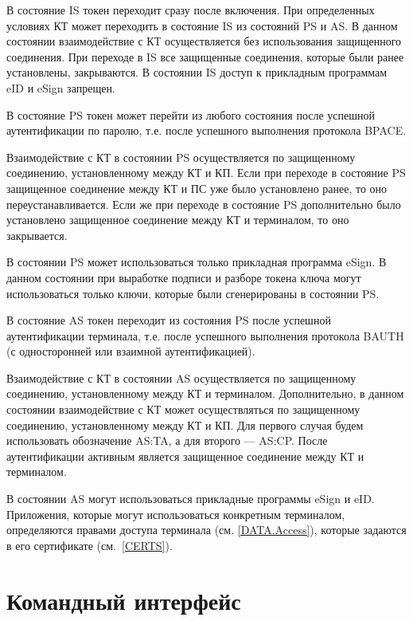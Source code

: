 В состояние IS токен переходит сразу после включения.
При определенных условиях КТ может переходить в состояние
IS из состояний PS и AS.
В данном состоянии взаимодействие с КТ осуществляется без использования 
защищенного соединения. При переходе в IS все защищенные соединения, 
которые были ранее установлены, закрываются.
В состоянии IS доступ к прикладным программам eID и eSign запрещен.

В состояние PS токен может перейти из любого состояния 
после успешной аутентификации по паролю, 
т.е. после успешного выполнения протокола BPACE. 
%

Взаимодействие с КТ в состоянии PS  осуществляется по 
защищенному соединению, установленному между КТ и КП. 
Если при переходе в состояние PS защищенное соединение между КТ и ПС уже было 
установлено ранее, то оно переустанавливается. 
Если же при переходе в состояние PS дополнительно было установлено 
защищенное соединение между КТ и терминалом, то оно закрывается.

В состоянии PS может использоваться только прикладная программа eSign.
В данном состоянии при выработке подписи и разборе токена ключа
могут использоваться только ключи, которые были 
сгенерированы в состоянии PS.

В состояние AS токен переходит из состояния PS 
после успешной аутентификации терминала, т.е. 
после успешного выполнения протокола BAUTH 
(с односторонней или взаимной аутентификацией). 

Взаимодействие с КТ в состоянии AS осуществляется по 
защищенному соединению, установленному между КТ и терминалом.
Дополнительно, в данном состоянии 
взаимодействие с КТ может осуществляться 
по защищенному соединению, установленному между КТ и КП.
Для первого случая будем использовать обозначение AS:TA, 
а для второго --- AS:CP. 
После аутентификации активным является защищенное 
соединение между КТ и терминалом.


В состоянии AS могут использоваться прикладные программы eSign и eID. 
Приложения, которые могут использоваться конкретным терминалом,
определяются правами доступа терминала (см. \ref{DATA.Access}),
которые задаются в его сертификате (см.~\ref{CERTS}).
 

\chapter{Командный интерфейс}
\label{CMDS}




